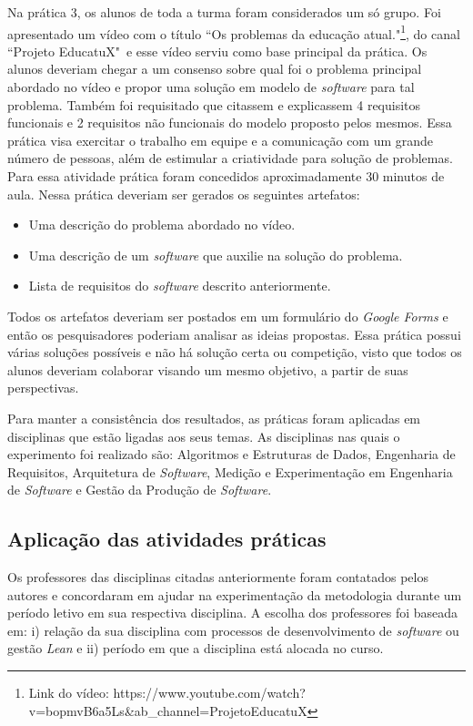 Na prática 3, os alunos de toda a turma foram considerados um só grupo. Foi apresentado um vídeo com o título ``Os problemas da educação atual."\footnote{Link do vídeo: https://www.youtube.com/watch?v=bopmvB6a5Ls\&ab\_channel=ProjetoEducatuX}, do canal ``Projeto EducatuX"\ e esse vídeo serviu como base principal da prática. Os alunos deveriam chegar a um consenso sobre qual foi o problema principal abordado no vídeo e propor uma solução em modelo de \textit{software} para tal problema. Também foi requisitado que citassem e explicassem 4 requisitos funcionais e 2 requisitos não funcionais do modelo proposto pelos mesmos. Essa prática visa exercitar o trabalho em equipe e a comunicação com um grande número de pessoas, além de estimular a criatividade para solução de problemas. Para essa atividade prática foram concedidos aproximadamente 30 minutos de aula. Nessa prática deveriam ser gerados os seguintes artefatos:
\begin{itemize}\setlength\itemsep{0.5em}
    \item Uma descrição do problema abordado no vídeo.
    \item Uma descrição de um \textit{software} que auxilie na solução do problema.
    \item Lista de requisitos do \textit{software} descrito anteriormente.
\end{itemize}
Todos os artefatos deveriam ser postados em um formulário do \textit{Google Forms} e então os pesquisadores poderiam analisar as ideias propostas. Essa prática possui várias soluções possíveis e não há solução certa ou competição, visto que todos os alunos deveriam colaborar visando um mesmo objetivo, a partir de suas perspectivas\nocite{VideoPrat3}.

Para manter a consistência dos resultados, as práticas foram aplicadas em disciplinas que estão ligadas aos seus temas. As disciplinas nas quais o experimento foi realizado são: Algoritmos e Estruturas de Dados, Engenharia de Requisitos, Arquitetura de \textit{Software}, Medição e Experimentação em Engenharia de \textit{Software} e Gestão da Produção de \textit{Software}. 

\subsection{Aplicação das atividades práticas}

Os professores das disciplinas citadas anteriormente foram contatados pelos autores e concordaram em ajudar na experimentação da metodologia durante um período letivo em sua respectiva disciplina. A escolha dos professores foi baseada em: i) relação da sua disciplina com processos de desenvolvimento de \textit{software} ou gestão \textit{Lean} e ii) período em que a disciplina está alocada no curso. 

